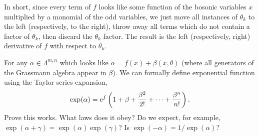In short, since every term of $f$ looks like some function of the
bosonic variables $x$ multiplied by a monomial of the odd variables, we
just move all instances of $\theta_{k}$ to the left (respectively, to the right), throw
away all terms which do not contain a factor of $\theta_{k}$, then
discard the $\theta_{k}$ factor. The result is the left (respectively,
right) derivative of $f$ with respect to $\theta_{k}$.


\begin{exercise}\label{xca:differentiation:taylor-series-for-exp}
For any $\alpha\in\Lambda^{m,n}$ which looks like
$\alpha=f(x)+\beta(x,\theta)$ (where all generators of the
Grassmann algebra appear in $\beta$). We can formally define exponential
function using the Taylor series expansion,
\begin{equation}
\exp(\alpha) = \mathrm{e}^{f}\left(1 + \beta + \frac{\beta^{2}}{2!} + \dots + \frac{\beta^{n}}{n!}\right).
\end{equation}
Prove this works. What laws does it obey? Do we expect, for example, $\exp(\alpha+\gamma)=\exp(\alpha)\exp(\gamma)$?
Is $\exp(-\alpha)=1/\exp(\alpha)$?
\end{exercise}
